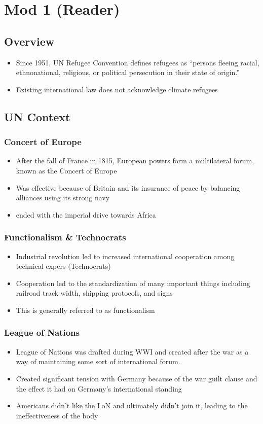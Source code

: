 \documentclass[11pt]{article}
\author{Sudhan Chitgopkar}
\date{\today}
\title{}
\begin{document}
\tableofcontents \clearpage\section{Mod 1 (Reader)}
\label{sec:orge3fae22}
\subsection{Overview}
\label{sec:org70fa73e}
\begin{itemize}
\item Since 1951, UN Refugee Convention defines refugees as ``persons fleeing racial, ethnonational, religious, or political persecution in their state of origin.''
\item Existing international law does not acknowledge climate refugees
\end{itemize}
\subsection{UN Context}
\label{sec:orgf1a6659}
\subsubsection{Concert of Europe}
\label{sec:orgbaa1d3f}
\begin{itemize}
\item After the fall of France in 1815, European powers form a multilateral forum, known as the Concert of Europe
\item Was effective because of Britain and its insurance of peace by balancing alliances using its strong navy
\item ended with the imperial drive towards Africa
\end{itemize}
\subsubsection{Functionalism \& Technocrats}
\label{sec:org0ecf25b}
\begin{itemize}
\item Industrial revolution led to increased international cooperation among technical expers (Technocrats)
\item Cooperation led to the standardization of many important things including railroad track width, shipping protocols, and signs
\item This is generally referred to as functionalism
\end{itemize}
\subsubsection{League of Nations}
\label{sec:org333b3ca}
\begin{itemize}
\item League of Nations was drafted during WWI and created after the war as a way of maintaining some sort of international forum.
\item Created significant tension with Germany because of the war guilt clause and the effect it had on Germany's international standing
\item Americans didn't like the LoN and ultimately didn't join it, leading to the ineffectiveness of the body
\end{itemize}
\end{document}
